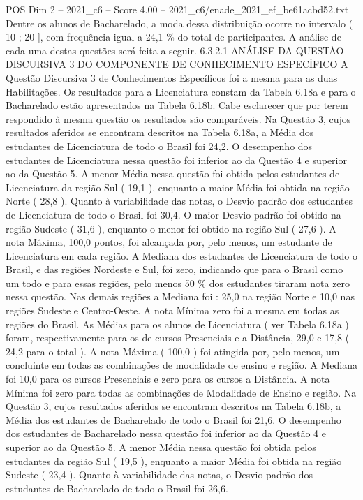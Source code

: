 \begin{textsample}{POS Dim 2 – 2021\_c6 – Score 4.00 – 2021\_c6/enade\_2021\_ef\_be61acbd52.txt}
Dentre os alunos de Bacharelado, a moda dessa distribuição ocorre no intervalo ( 10 ; 20 ], com frequência igual a 24,1 \% do total de participantes.
A análise de cada uma destas questões será feita a seguir. 6.3.2.1 ANÁLISE DA QUESTÃO DISCURSIVA 3 DO COMPONENTE DE CONHECIMENTO ESPECÍFICO A Questão Discursiva 3 de Conhecimentos Específicos foi a mesma para as duas Habilitações.
Os resultados para a Licenciatura constam da Tabela 6.18a e para o Bacharelado estão apresentados na Tabela 6.18b.
Cabe esclarecer que por terem respondido à mesma questão os resultados são comparáveis.
Na Questão 3, cujos resultados aferidos se encontram descritos na Tabela 6.18a, a Média dos estudantes de Licenciatura de todo o Brasil foi 24,2.
O desempenho dos estudantes de Licenciatura nessa questão foi inferior ao da Questão 4 e superior ao da Questão 5.
A menor Média nessa questão foi obtida pelos estudantes de Licenciatura da região Sul ( 19,1 ), enquanto a maior Média foi obtida na região Norte ( 28,8 ).
Quanto à variabilidade das notas, o Desvio padrão dos estudantes de Licenciatura de todo o Brasil foi 30,4.
O maior Desvio padrão foi obtido na região Sudeste ( 31,6 ), enquanto o menor foi obtido na região Sul ( 27,6 ).
A nota Máxima, 100,0 pontos, foi alcançada por, pelo menos, um estudante de Licenciatura em cada região.
A Mediana dos estudantes de Licenciatura de todo o Brasil, e das regiões Nordeste e Sul, foi zero, indicando que para o Brasil como um todo e para essas regiões, pelo menos 50 \% dos estudantes tiraram nota zero nessa questão.
Nas demais regiões a Mediana foi : 25,0 na região Norte e 10,0 nas regiões Sudeste e Centro-Oeste.
A nota Mínima zero foi a mesma em todas as regiões do Brasil.
As Médias para os alunos de Licenciatura ( ver Tabela 6.18a ) foram, respectivamente para os de cursos Presenciais e a Distância, 29,0 e 17,8 ( 24,2 para o total ).
A nota Máxima ( 100,0 ) foi atingida por, pelo menos, um concluinte em todas as combinações de modalidade de ensino e região.
A Mediana foi 10,0 para os cursos Presenciais e zero para os cursos a Distância.
A nota Mínima foi zero para todas as combinações de Modalidade de Ensino e região.
Na Questão 3, cujos resultados aferidos se encontram descritos na Tabela 6.18b, a Média dos estudantes de Bacharelado de todo o Brasil foi 21,6.
O desempenho dos estudantes de Bacharelado nessa questão foi inferior ao da Questão 4 e superior ao da Questão 5.
A menor Média nessa questão foi obtida pelos estudantes da região Sul ( 19,5 ), enquanto a maior Média foi obtida na região Sudeste ( 23,4 ).
Quanto à variabilidade das notas, o Desvio padrão dos estudantes de Bacharelado de todo o Brasil foi 26,6.

\end{textsample}
